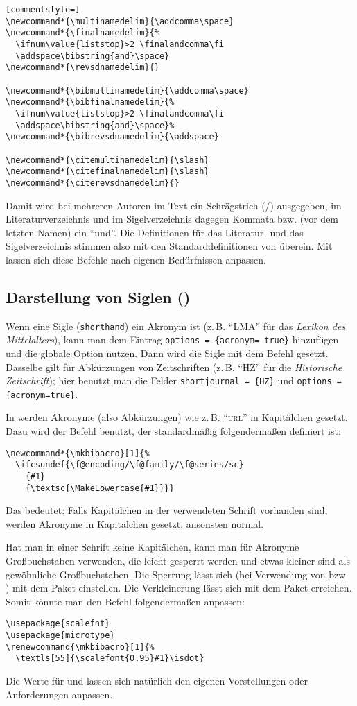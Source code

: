\documentclass[ngerman]{scrartcl}
\begin{document}
\begin{lstlisting}[commentstyle=]
\newcommand*{\multinamedelim}{\addcomma\space}
\newcommand*{\finalnamedelim}{%
  \ifnum\value{liststop}>2 \finalandcomma\fi
  \addspace\bibstring{and}\space}
\newcommand*{\revsdnamedelim}{}

\newcommand*{\bibmultinamedelim}{\addcomma\space}
\newcommand*{\bibfinalnamedelim}{%
  \ifnum\value{liststop}>2 \finalandcomma\fi
  \addspace\bibstring{and}\space}%
\newcommand*{\bibrevsdnamedelim}{\addspace}

\newcommand*{\citemultinamedelim}{\slash}
\newcommand*{\citefinalnamedelim}{\slash}
\newcommand*{\citerevsdnamedelim}{}
\end{lstlisting}
Damit wird bei mehreren Autoren im Text ein Schrägstrich (/) ausgegeben, im
Literaturverzeichnis und im Sigelverzeichnis dagegen Kommata bzw. (vor dem
letzten Namen) ein \enquote{und}. Die Definitionen für das Literatur- und das 
Sigelverzeichnis stimmen also mit den Standarddefinitionen von \bl{} überein.
Mit  lassen sich diese Befehle nach eigenen Bedürfnissen
anpassen.

\subsection{Darstellung von Siglen ()}
\label{mkbibacro-anpassen}
Wenn eine Sigle (\texttt{shorthand}) ein Akronym ist (z.\,B. \enquote{LMA} für
das \emph{Lexikon des Mittelalters}), kann man dem Eintrag 
\texttt{options\,=\,\{acronym= true\}} hinzufügen und die globale Option
 nutzen. Dann wird die Sigle mit dem Befehl 
gesetzt. Dasselbe gilt für Abkürzungen von Zeitschriften (z.\,B. \enquote{HZ} für
die \emph{Historische Zeitschrift}); hier benutzt man die Felder
\texttt{shortjournal\,=\,\{HZ\}} und \texttt{options\,=\,\{acronym=true\}}.

In \bl{} werden Akronyme (also Abkürzungen) wie z.\,B. \enquote{\textsc{url}} in 
Kapitälchen gesetzt. Dazu wird der Befehl  benutzt, der standardmäßig
folgendermaßen definiert ist:
\begin{lstlisting}
\newcommand*{\mkbibacro}[1]{%
  \ifcsundef{\f@encoding/\f@family/\f@series/sc}
    {#1}
    {\textsc{\MakeLowercase{#1}}}}
\end{lstlisting}
Das bedeutet: Falls Kapitälchen in der verwendeten Schrift vorhanden sind, werden
Akronyme in Kapitälchen gesetzt, ansonsten normal. 

Hat man in einer Schrift keine Kapitälchen, kann man für
Akronyme Großbuchstaben verwenden, die leicht gesperrt werden und etwas kleiner
sind als gewöhnliche Großbuchstaben. Die Sperrung lässt sich (bei Verwendung von 
 bzw. ) mit dem Paket  einstellen. Die 
Verkleinerung lässt sich mit dem Paket  erreichen. Somit könnte man
den Befehl  folgendermaßen anpassen:
\begin{lstlisting}
\usepackage{scalefnt}
\usepackage{microtype}
\renewcommand{\mkbibacro}[1]{%
  \textls[55]{\scalefont{0.95}#1}\isdot}
\end{lstlisting}
Die Werte für  und  lassen sich natürlich den eigenen 
Vorstellungen oder Anforderungen anpassen.
\end{document}
